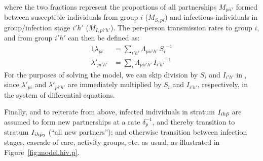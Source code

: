 where the two fractions represent the proportions of all partnerships $M_{pii'}$
formed between susceptible individuals from group $i$ ($M_{S,pi}$)
and infectious individuals in group/infection stage $i'h'$ ($M_{I,pi'h'}$).
The per-person transmission rates to group $i$, and from group $i'h'$ can then be defined as:
\begin{alignat}{1}
  \lambda_{pi} &= \sum_{i'h'} \Lambda_{pii'h'}\,{S_{i}}^{-1} \label{eq:foi.i} \\
  \lambda'_{pi'h'} &= \sum_{i} \Lambda_{pii'h'}\,{I_{i'h'}}^{-1} \label{eq:foi.jh}
\end{alignat}
For the purposes of solving the model,
we can skip division by $S_{i}$ and $I_{i'h'}$ in ,
since $\lambda'_{pi}$ and $\lambda'_{pi'h'}$ are immediately multiplied by $S_{i}$ and $I_{i'h'}$,
respectively, in the system of differential equations.
\par
Finally, and to reiterate from above, infected individuals in stratum $I_{ih\bar{p}}$
are assumed to form new partnerships at a rate $\delta_p^{-1}$,
and thereby transition to stratum $I_{ih\bar{p}_0}$ (``all new partners''); and
otherwise transition between infection stages, cascade of care, activity groups, etc. as usual,
as illustrated in Figure~\ref{fig:model.hiv.p}.
